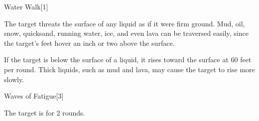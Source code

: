\begin{spellsection}{Water Walk}[1]
    \begin{spellheader}
    \end{spellheader}
    \begin{spellcontent}
        \begin{spelltargetinginfo}
        \end{spelltargetinginfo}
        \begin{spelleffects}
            \spelleffect The target threats the surface of any liquid as if it were firm ground.
            Mud, oil, snow, quicksand, running water, ice, and even lava can be traversed easily, since the target's feet hover an inch or two above the surface.
            \par If the target is below the surface of a liquid, it rises toward the surface at 60 feet per round.
            Thick liquids, such as mud and lava, may cause the target to rise more slowly.
            \spelldur \durshort
        \end{spelleffects}
    \end{spellcontent}
    \begin{spellfooter}
        \miscastexplode
    \end{spellfooter}
    \begin{spellaugments}
    \end{spellaugments}
\end{spellsection}

\begin{spellsection}{Waves of Fatigue}[3]
    \begin{spellheader}
    \end{spellheader}
    \begin{spellcontent}
        \begin{spelltargetinginfo}
        \end{spelltargetinginfo}
        \begin{spelleffects}
            \spelleffect The target is \fatigued for 2 rounds.
        \end{spelleffects}
    \end{spellcontent}
    \begin{spellfooter}
        \miscastexplode
    \end{spellfooter}
    \begin{spellaugments}
    \end{spellaugments}
\end{spellsection}

